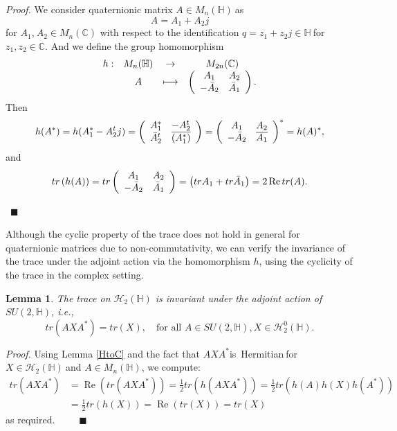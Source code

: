 \documentclass[a4paper]{article}%
\newtheorem{lemma}[theorem]{Lemma}
\newenvironment{proof}[1][Proof]{\noindent\textit{#1.} }{}
\begin{document}
\begin{proof}
We consider quaternionic matrix $A\in M_{n}(\mathbb{H})\ $as
\[
A=A_{1}+A_{2}j
\]
for $A_{1}$,$\ A_{2}\in M_{n}(\mathbb{C})$ with respect to the identification
$q=z_{1}+z_{2}j\in\mathbb{H\ }$for $z_{1},z_{2}\in\mathbb{C}$. And we define
the group homomorphism
\[%
\begin{array}
[c]{cccc}%
h: & M_{n}(\mathbb{H}) & \rightarrow & M_{2n}(\mathbb{C})\\
& A & \longmapsto & \left(
\begin{array}
[c]{cc}%
A_{1} & A_{2}\\
-\bar{A}_{2} & \bar{A}_{1}%
\end{array}
\right)  .
\end{array}
\]
Then
\[
h(A^{\ast})=h(A_{1}^{\ast}-A_{2}^{t}j)=\left(
\begin{array}
[c]{cc}%
A_{1}^{\ast} & -A_{2}^{t}\\
\bar{A}_{2}^{t} & \overline{\left(  A_{1}^{\ast}\right)  }%
\end{array}
\right)  =\left(
\begin{array}
[c]{cc}%
A_{1} & A_{2}\\
-\bar{A}_{2} & \overline{A_{1}}%
\end{array}
\right)  ^{\ast}=h(A)^{\ast}\text{,}%
\]
and
\[
tr\left(  h(A)\right)  =tr\left(
\begin{array}
[c]{cc}%
A_{1} & A_{2}\\
-\bar{A}_{2} & \bar{A}_{1}%
\end{array}
\right)  =\left(  trA_{1}+tr\bar{A}_{1}\right)  =2\operatorname{Re}tr(A).
\]


\ $\blacksquare$
\end{proof}

\bigskip

Although the cyclic property of the trace does not hold in general for
quaternionic matrices due to non-commutativity, we can verify the invariance
of the trace under the adjoint action via the homomorphism $h$, using the
cyclicity of the trace in the complex setting.

\begin{lemma}
The trace on $\mathcal{H}_{2}(\mathbb{H})$ is invariant under the adjoint
action of $SU(2,\mathbb{H})$, i.e.,
\[
tr(AXA^{\ast})=tr(X),\quad\text{for all }A\in SU(2,\mathbb{H}),X\in
\mathcal{H}_{2}^{0}(\mathbb{H}).
\]

\end{lemma}

\begin{proof}
Using Lemma \ref{HtoC} and the fact that $AXA^{\ast}$is\ Hermitian$~$for
$X\in\mathcal{H}_{2}(\mathbb{H})\ $and $A\in M_{n}(\mathbb{H})$, we compute:
\begin{align*}
tr(AXA^{\ast})  &  =\operatorname{Re}(tr(AXA^{\ast}))=\tfrac{1}{2}%
tr(h(AXA^{\ast}))=\tfrac{1}{2}tr(h(A)h(X)h(A^{\ast}))\\
&  =\tfrac{1}{2}tr(h(X))=\operatorname{Re}(tr(X))=tr(X)
\end{align*}
as required.\ \ \ \ \ $\blacksquare$
\end{proof}
\end{document}
